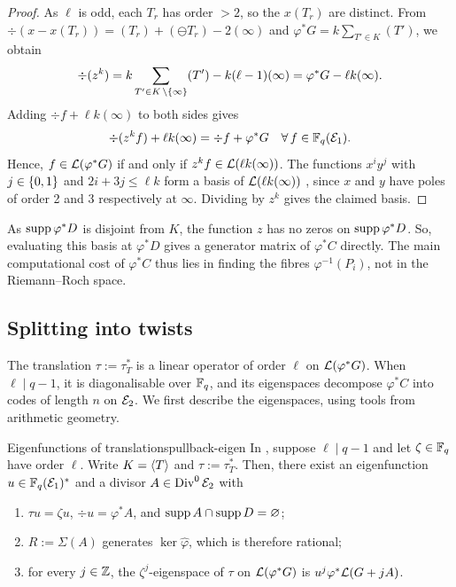 \documentclass[twocolumn, 11pt]{scrartcl}
\begin{document}
\begin{proof}
    As $\ell$ is odd, each $T_r$ has order $>2$, so the $x(T_r)$ are distinct. From $\div(x-x(T_r))=(T_r)+(\ominus T_r)-2(\infty)$ and $\varphi^*G=k\sum_{T'\in K}(T')$, we obtain
    \[ \div(z^k)=k\sum_{T'\in K\operatorname{\setminus}\{\infty\}}(T')-k(\ell-1)(\infty)=\varphi^*G-\ell k(\infty). \]
    Adding $\div f+\ell k(\infty)$ to both sides gives
    \[ \div(z^kf)+\ell k(\infty)=\div f+\varphi^*G \quad \forall f\in\bbF_q(\mcE_1). \]
    Hence, $f\in\mathcal{L}(\varphi^*G)$ if and only if $z^kf\in\mathcal{L}(\ell k(\infty))$. The functions $x^iy^j$ with $j\in\{0,1\}$ and $2i+3j\leq\ell k$ form a basis of $\mathcal{L}(\ell k(\infty))$ \cite[\S III.3]{silverman2009arithmetic}, since $x$ and $y$ have poles of order 2 and 3 respectively at $\infty$. Dividing by $z^k$ gives the claimed basis.
\end{proof}

As $\operatorname{supp}\varphi^*D$ is disjoint from $K$, the function $z$ has no zeros on $\operatorname{supp}\varphi^*D$. So, evaluating this basis at $\varphi^*D$ gives a generator matrix of $\varphi^*C$ directly. The main computational cost of $\varphi^*C$ thus lies in finding the fibres $\varphi^{-1}(P_i)$, not in the Riemann--Roch space.

\subsection{Splitting into twists} \label{subsection:splitting}

The translation $\tau:=\tau_T^*$ is a linear operator of order $\ell$ on $\mathcal{L}(\varphi^*G)$. When $\ell\mid q-1$, it is diagonalisable over $\mathbb{F}_q$, and its eigenspaces decompose $\varphi^*C$ into codes of length $n$ on $\mathcal{E}_2$. We first describe the eigenspaces, using tools from arithmetic geometry.

\begin{lemma}{Eigenfunctions of translations}{pullback-eigen}
    In , suppose $\ell\mid q-1$ and let $\zeta\in\mathbb{F}_q$ have order $\ell$. Write $K=\langle T\rangle$ and $\tau:=\tau_T^*$. Then, there exist an eigenfunction $u\in\mathbb{F}_q(\mathcal{E}_1)^*$ and a divisor $A\in\operatorname{Div}^0\mathcal{E}_2$ with
    \begin{enumerate}
        \item \label{enum:eigen-u} $\tau u=\zeta u$, $\div u=\varphi^*A$, and $\operatorname{supp} A\cap\operatorname{supp} D=\varnothing$;
        \item \label{enum:eigen-R} $R:=\Sigma(A)$ generates $\ker\hat\varphi$, which is therefore rational;
        \item \label{enum:eigen-space} for every $j\in\mathbb{Z}$, the $\zeta^j$-eigenspace of $\tau$ on $\mathcal{L}(\varphi^*G)$ is $u^j\varphi^*\mathcal{L}(G+jA)$.
    \end{enumerate}
\end{lemma}
\end{document}
